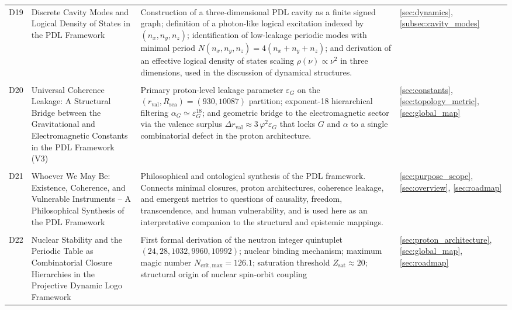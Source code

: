 \documentclass[11pt,a4paper]{article}
\begin{document}
\begin{longtable}{@{}p{0.9cm}L{5cm}L{6.5cm}L{2.4cm}@{}}
  D19 & 
  Discrete Cavity Modes and Logical Density of States in the PDL Framework & Construction of a three-dimensional PDL cavity as a finite signed graph; definition of a photon-like logical excitation indexed by $(n_x,n_y,n_z)$; identification of low-leakage periodic modes with minimal period $N(n_x,n_y,n_z)=4(n_x+n_y+n_z)$; and derivation of an effective logical density of states scaling $\rho(\nu)\propto \nu^2$ in three dimensions, used in the discussion of dynamical structures. & 
  \ref{sec:dynamics}, \ref{subsec:cavity_modes} \\\\[0.4em]

  D20 &
  {Universal Coherence Leakage: A Structural Bridge between the Gravitational and Electromagnetic Constants in the PDL Framework} (V3) &
  Primary proton-level leakage parameter $\varepsilon_G$ on the $(r_{\mathrm{val}},R_{\mathrm{sea}})=(930,10087)$ partition; exponent-18 hierarchical filtering $\alpha_G \simeq \varepsilon_G^{18}$; and geometric bridge to the electromagnetic sector via the valence surplus $\Delta r_{\mathrm{val}} \approx 3\,\varphi^2 \varepsilon_G$ that locks $G$ and $\alpha$ to a single combinatorial defect in the proton architecture. &
  \ref{sec:constants}, \ref{sec:topology_metric}, \ref{sec:global_map} \\\\[0.4em]

  D21 & 
  Whoever We May Be: Existence, Coherence, and Vulnerable Instruments -- A Philosophical Synthesis of the PDL Framework & 
  Philosophical and ontological synthesis of the PDL framework.\citep{WhoeverWeMayBe2026} Connects minimal closures, proton architectures, coherence leakage, and emergent metrics to questions of causality, freedom, transcendence, and human vulnerability, and is used here as an interpretative companion to the structural and epistemic mappings. & 
  \ref{sec:purpose_scope}, \ref{sec:overview}, \ref{sec:roadmap} \\\\[0.4em]

D22 &
  Nuclear Stability and the Periodic Table as Combinatorial Closure Hierarchies in the Projective Dynamic Logo Framework &
  First formal derivation of the neutron integer quintuplet $(24,28,1032,9960,10992)$; nuclear binding mechanism; maximum magic number $N_{\mathrm{crit,max}} = 126.1$; saturation threshold $Z_{\mathrm{sat}} \approx 20$; structural origin of nuclear spin-orbit coupling &
  \ref{sec:proton_architecture}, \ref{sec:global_map}, \ref{sec:roadmap} \\[0.4em]


\end{longtable}
\end{document}
